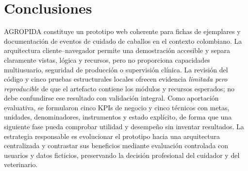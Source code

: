 \documentclass[conference,10pt]{IEEEtran}
\begin{document}
\section{Conclusiones}
AGROPIDA constituye un prototipo web coherente para fichas de ejemplares y documentación de eventos de cuidado de caballos en el contexto colombiano. La arquitectura cliente--navegador permite una demostración accesible y separa claramente vistas, lógica y recursos, pero no proporciona capacidades multiusuario, seguridad de producción o supervisión clínica. La revisión del código y cinco pruebas estructurales locales ofrecen evidencia \emph{limitada pero reproducible} de que el artefacto contiene los módulos y recursos esperados; no debe confundirse ese resultado con validación integral. Como aportación evaluativa, se formularon cinco KPIs de negocio y cinco técnicos con metas, unidades, denominadores, instrumentos y estado explícito, de forma que una siguiente fase pueda comprobar utilidad y desempeño sin inventar resultados. La estrategia responsable es evolucionar el prototipo hacia una arquitectura centralizada y contrastar sus beneficios mediante evaluación controlada con usuarios y datos ficticios, preservando la decisión profesional del cuidador y del veterinario.
\end{document}
